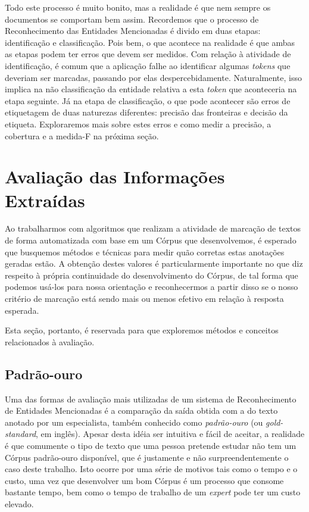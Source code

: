 \documentclass[11pt]{report}
\begin{document}
Todo este processo é muito bonito, mas a realidade é que nem sempre os documentos se comportam bem assim. Recordemos que o processo de Reconhecimento das Entidades Mencionadas
é divido em duas etapas: identificação e classificação. Pois bem, o que acontece na realidade é que ambas as etapas podem ter erros que devem ser medidos. Com relação
à atividade de identificação, é comum que a aplicação falhe ao identificar algumas \textit{tokens} que deveriam ser marcadas, passando por elas despercebidamente. Naturalmente, isso
implica na não classificação da entidade relativa a esta \textit{token} que aconteceria na etapa seguinte. Já na etapa de classificação, o que pode acontecer são erros de etiquetagem
de duas naturezas diferentes: precisão das fronteiras e decisão da etiqueta. Exploraremos mais sobre estes erros e como medir a precisão, a cobertura e a medida-F na próxima seção.

\section{Avaliação das Informações Extraídas}

\indent\indent Ao trabalharmos com algoritmos que realizam a atividade de marcação de textos de forma automatizada com base em um Córpus que desenvolvemos, é
esperado que busquemos métodos e técnicas para medir quão corretas estas anotações geradas estão. A obtenção destes valores é particularmente
importante no que diz respeito à própria continuidade do desenvolvimento do Córpus, de tal forma que podemos usá-los para nossa orientação e
reconhecermos a partir disso se o nosso critério de marcação está sendo mais ou menos efetivo em relação à resposta esperada.

Esta seção, portanto,
é reservada para que exploremos métodos e conceitos relacionados à avaliação.

\subsection{Padrão-ouro}

\indent\indent Uma das formas de avaliação mais utilizadas de um sistema de Reconhecimento de Entidades Mencionadas é a comparação da saída obtida com a do texto anotado por
um especialista, também conhecido como \textit{padrão-ouro} (ou \textit{gold-standard}, em inglês). Apesar desta idéia ser intuitiva e fácil de aceitar, a realidade é que
comumente o tipo de texto que uma pessoa pretende estudar não tem um Córpus padrão-ouro disponível, que é justamente e não surpreendentemente o caso deste trabalho. Isto ocorre
por uma série de motivos tais como o tempo e o custo, uma vez que desenvolver um bom Córpus é um processo que consome bastante tempo, bem como o tempo de trabalho de um \textit{expert}
pode ter um custo elevado.
\end{document}
